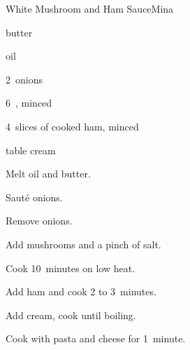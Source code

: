 \begin{recipe}{White Mushroom and Ham Sauce}{Mina}{}

\begin{ingredients}
\item \C{\quarter} butter
\item \C{\half} oil
\item 2~onions
\item 6~, minced
\item 4~slices of cooked ham, minced
\item {} table cream
\item {}
\end{ingredients}

\begin{directions}
\item Melt oil and butter.
\item Saut\'e onions.
\item Remove onions.
\item Add mushrooms and a pinch of salt.
\item Cook 10~minutes on low heat.
\item Add ham and cook 2 to 3~minutes.
\item Add cream, cook until boiling.
\item Cook with pasta and cheese for 1~minute.
\end{directions}

\end{recipe}
